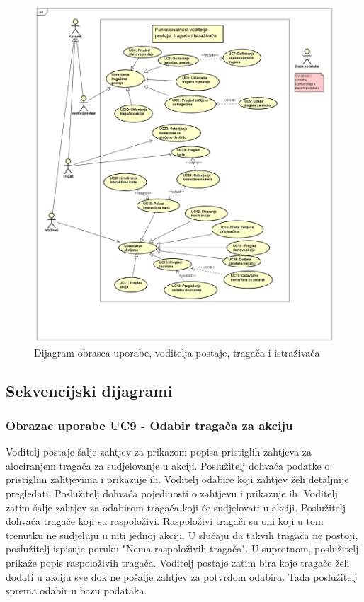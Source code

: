 					\begin{figure}[H]
						\includegraphics[scale=0.4]{dijagrami/voditelj-tragac-istrazivac-dijagram.png} 
						\centering
						\caption{Dijagram obrasca uporabe, voditelja postaje, tragača i istraživača}
						\label{fig:promjene}
					\end{figure}
					
			\eject				
				
			\subsection{Sekvencijski dijagrami}
			
				\subsubsection{Obrazac uporabe UC9 - Odabir tragača za akciju}
				Voditelj postaje šalje zahtjev za prikazom popisa pristiglih zahtjeva za alociranjem tragača za sudjelovanje u akciji. Poslužitelj dohvaća podatke o pristiglim zahtjevima i prikazuje ih. Voditelj odabire koji zahtjev želi detaljnije pregledati. Poslužitelj dohvaća pojedinosti o zahtjevu i prikazuje ih. Voditelj zatim šalje zahtjev za odabirom tragača koji će sudjelovati u akciji. Poslužitelj dohvaća tragače koji su raspoloživi. Raspoloživi tragači su oni koji u tom trenutku ne sudjeluju u niti jednoj akciji. U slučaju da takvih tragača ne postoji, poslužitelj ispisuje poruku "Nema raspoloživih tragača". U suprotnom, poslužitelj prikaže popis raspoloživih tragača.  Voditelj postaje zatim bira koje tragače želi dodati u akciju sve dok ne pošalje zahtjev za potvrdom odabira. Tada poslužitelj sprema odabir u bazu podataka.
				
